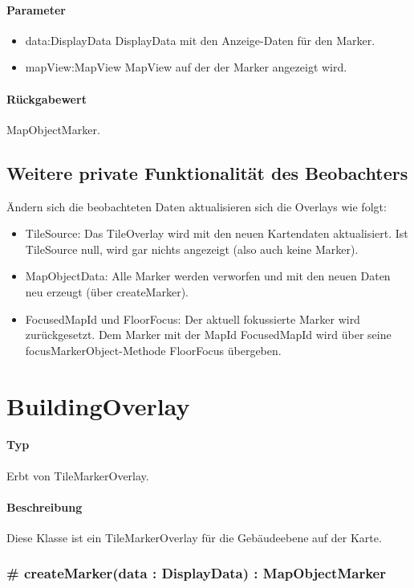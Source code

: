 \paragraph*{Parameter}
\begin{itemize}
    \item data:DisplayData DisplayData mit den Anzeige-Daten für den Marker.
    \item mapView:MapView MapView auf der der Marker angezeigt wird.
\end{itemize}
\paragraph*{Rückgabewert}
MapObjectMarker.


\subsection{Weitere private Funktionalität des Beobachters}
Ändern sich die beobachteten Daten aktualisieren sich die Overlays wie folgt:
\begin{itemize}
    \item TileSource: Das TileOverlay wird mit den neuen Kartendaten aktualisiert.
    Ist TileSource null, wird gar nichts angezeigt (also auch keine Marker).
    \item MapObjectData: Alle Marker werden verworfen und mit den neuen Daten neu erzeugt (über createMarker).
    \item FocusedMapId und FloorFocus: Der aktuell fokussierte Marker wird zurückgesetzt.
    Dem Marker mit der MapId FocusedMapId wird über seine focusMarkerObject-Methode FloorFocus übergeben.
\end{itemize}

\section{BuildingOverlay}
\paragraph*{Typ}
Erbt von TileMarkerOverlay.
\paragraph*{Beschreibung}
Diese Klasse ist ein TileMarkerOverlay für die Gebäudeebene auf der Karte.

\subsubsection{# createMarker(data : DisplayData) : MapObjectMarker}%

